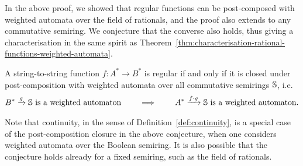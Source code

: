 In the above proof, we showed that regular functions can be post-composed with weighted automata over the field of rationals, and the proof also extends to any commutative semiring. We conjecture that the converse also holds, thus giving a characterisation in the same spirit as Theorem~\ref{thm:characterisation-rational-functions-weighted-automata}.
\begin{conjecture}\label{conj:regular-via-weighted-automata}
    A string-to-string function $f : A^* \to B^*$ is regular if and only if it is closed under post-composition with weighted automata over all commutative semirings $\mathbb S$, i.e.
    \begin{align*}
    B^* \xrightarrow g \mathbb S \text{ is a weighted automaton} \qquad \implies \qquad A^* \xrightarrow{f \cdot g} \mathbb S \text{ is a weighted automaton}.
    \end{align*}
\end{conjecture}
Note that continuity, in the sense of Definition~\ref{def:continuity}, is a special case of the post-composition closure in the above conjecture, when one considers weighted automata over the Boolean semiring. It is also possible that the conjecture holds already for a fixed semiring, such as the field of rationals.
\exerciseheader 

